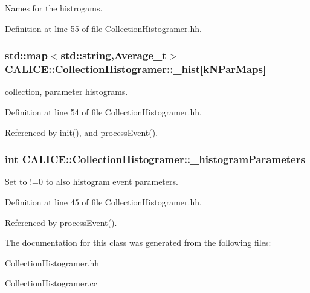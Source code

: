 Names for the histrogams. 

Definition at line 55 of file CollectionHistogramer.hh.
\subsubsection[{\_\-hist}]{\setlength{\rightskip}{0pt plus 5cm}std::map$<$std::string,Average\_\-t$>$ {\bf CALICE::CollectionHistogramer::\_\-hist}[kNParMaps]\hspace{0.3cm}{\ttfamily  [protected]}}\label{classCALICE_1_1CollectionHistogramer_a9f492bba67d841ac03bdf3beeb646d8e}


collection, parameter histograms. 

Definition at line 54 of file CollectionHistogramer.hh.

Referenced by init(), and processEvent().
\subsubsection[{\_\-histogramParameters}]{\setlength{\rightskip}{0pt plus 5cm}int {\bf CALICE::CollectionHistogramer::\_\-histogramParameters}\hspace{0.3cm}{\ttfamily  [protected]}}\label{classCALICE_1_1CollectionHistogramer_ac12fee356ac0d035722040ca71751aa1}


Set to !=0 to also histogram event parameters. 

Definition at line 45 of file CollectionHistogramer.hh.

Referenced by processEvent().

The documentation for this class was generated from the following files:\begin{DoxyCompactItemize}
\item 
CollectionHistogramer.hh\item 
CollectionHistogramer.cc\end{DoxyCompactItemize}
